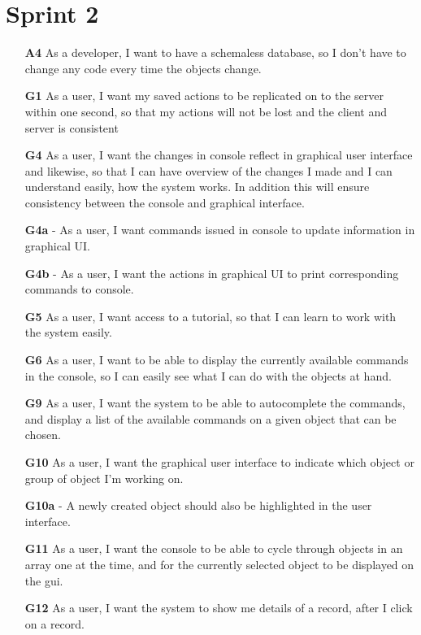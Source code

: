 \section{Sprint 2}
\label{sprint2pb}

\begin{itemize}
  \item [\textbf{A4}] As a developer, I want to have a schemaless database, so I don't have to change any code every time the objects change.
  \item [\textbf{G1}] As a user, I want my saved actions to be replicated on to the server within one second, so that my actions will not be lost and the client and server is consistent
  \item [\textbf{G4}] As a user, I want the changes in console reflect in graphical user interface and likewise, so that I can have overview of the changes I made and I can understand easily, how the system works. In addition this will ensure consistency between the console and graphical interface.
  \item [\textbf{G4a}] - As a user, I want commands issued in console to update information in graphical UI.
  \item [\textbf{G4b}] - As a user, I want the actions in graphical UI to print corresponding commands to console.
  \item [\textbf{G5}] As a user, I want access to a tutorial, so that I can learn to work with the system easily.
  \item [\textbf{G6}] As a user, I want to be able to display the currently available commands in the console, so I can easily see what I can do with the objects at hand.
  \item [\textbf{G9}] As a user, I want the system to be able to autocomplete the commands, and display a list of the available commands on a given object that can be chosen.
  \item [\textbf{G10}] As a user, I want the graphical user interface to indicate which object or group of object I’m working on.
  \item [\textbf{G10a}] - A newly created object should also be highlighted in the user interface.
  \item [\textbf{G11}] As a user, I want the console to be able to cycle through objects in an array one at the time, and for the currently selected object to be displayed on the gui.
  \item [\textbf{G12}] As a user, I want the system to show me details of a record, after I click on a record.

\end{itemize}
